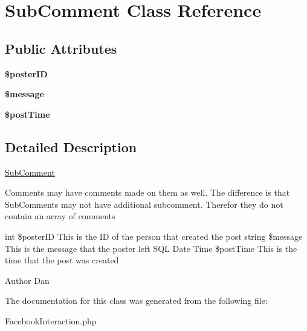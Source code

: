 \hypertarget{class_sub_comment}{
\section{SubComment Class Reference}
\label{class_sub_comment}
}
\subsection*{Public Attributes}
\begin{DoxyCompactItemize}
\item 
\hypertarget{class_sub_comment_a92018b1cadfb01788b9b353c7586be82}{
{\bfseries \$posterID}}
\label{class_sub_comment_a92018b1cadfb01788b9b353c7586be82}

\item 
\hypertarget{class_sub_comment_ad040f0cd38eb84503f965bfb2fb49a79}{
{\bfseries \$message}}
\label{class_sub_comment_ad040f0cd38eb84503f965bfb2fb49a79}

\item 
\hypertarget{class_sub_comment_a9ef26f260574ece8db32a79401eca142}{
{\bfseries \$postTime}}
\label{class_sub_comment_a9ef26f260574ece8db32a79401eca142}

\end{DoxyCompactItemize}


\subsection{Detailed Description}
\hyperlink{class_sub_comment}{SubComment}

Comments may have comments made on them as well. The difference is that SubComments may not have additional subcomment. Therefor they do not contain an array of comments

int \$posterID This is the ID of the person that created the post string \$message This is the message that the poster left SQL Date Time \$postTime This is the time that the post was created \begin{DoxyAuthor}{Author}
Dan 
\end{DoxyAuthor}


The documentation for this class was generated from the following file:\begin{DoxyCompactItemize}
\item 
FacebookInteraction.php\end{DoxyCompactItemize}
